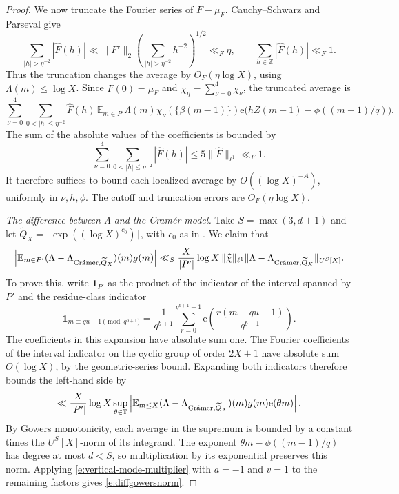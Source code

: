 \documentclass[12pt]{amsart}
\newcommand{\1}{\mathbf 1}
\newcommand{\e}{\mathrm e}
\newcommand{\Cramer}{\textup{Cr\'amer}}
\theoremstyle{definition}
\begin{document}
\begin{proof}
We now truncate the Fourier series of \(F-\mu_F\).
Cauchy--Schwarz and Parseval give
\[
 \sum_{|h|>\eta^{-2}}|\widehat F(h)|
 \ll \|F'\|_2
       \left(\sum_{|h|>\eta^{-2}}h^{-2}\right)^{1/2}
 \ll_F\eta,
 \qquad
 \sum_{h\in\mathbb Z}|\widehat F(h)|\ll_F1.
\]
Thus the truncation changes the average by \(O_F(\eta\log X)\),
using \(\Lambda(m)\leq\log X\). Since \(\widehat F(0)=\mu_F\) and
\(\chi_\eta=\sum_{\nu=0}^4\chi_\nu\), the truncated average is
\[
 \sum_{\nu=0}^4\sum_{0<|h|\leq\eta^{-2}}\widehat F(h)\,
 \mathbb E_{m\in P'}\Lambda(m)\chi_\nu(\{\beta(m-1)\})
 \e\bigl(hZ(m-1)-\phi((m-1)/q)\bigr).
\]
The sum of the absolute values of the coefficients is bounded by
\[
 \sum_{\nu=0}^4\sum_{0<|h|\leq\eta^{-2}}|\widehat F(h)|
 \leq 5\|\widehat F\|_{\ell^1}\ll_F 1.
\]
It therefore suffices to bound each localized average by
\(O((\log X)^{-A})\), uniformly in \(\nu,h,\phi\). The cutoff
and truncation errors are \(O_F(\eta\log X)\).

\medskip
\noindent\emph{The difference between \(\Lambda\) and the Cram\'er model.}
Take \(S=\max(3,d+1)\) and let
\(\widetilde Q_X=\lceil\exp((\log X)^{c_0})\rceil\), with \(c_0\)
as in \cite[Definition~2.3]{KMTT}. We claim that
\begin{align}\label{e:diffgowersnorm}
     \left|\mathbb E_{m\in P'}
   (\Lambda-\Lambda_{\Cramer,\widetilde Q_X})(m)g(m)\right|
 \ll_S
 \frac{X}{|P'|}\log X\,\|\widehat\chi\|_{\ell^1}
 \|\Lambda-\Lambda_{\Cramer,\widetilde Q_X}\|_{U^S[X]}.
\end{align}
To prove this, write \(\mathbf1_{P'}\) as the product of the
indicator of the interval spanned by \(P'\) and the residue-class
indicator
\[
 \mathbf1_{m\equiv qu+1\!\!\!\pmod{q^{b+1}}}
 =\frac1{q^{b+1}}\sum_{r=0}^{q^{b+1}-1}
   \e\!\left(\frac{r(m-qu-1)}{q^{b+1}}\right).
\]
The coefficients in this expansion have absolute sum one. The
Fourier coefficients of the interval indicator on the cyclic
group of order \(2X+1\) have absolute sum \(O(\log X)\), by the
geometric-series bound. Expanding both indicators therefore bounds
the left-hand side by
\[
 \ll \frac{X}{|P'|}\log X
 \sup_{\theta\in\mathbb T}
 \left|\mathbb E_{m\leq X}
   (\Lambda-\Lambda_{\Cramer,\widetilde Q_X})(m)
   g(m)\e(\theta m)\right|.
\]
By Gowers monotonicity, each average in the supremum is bounded
by a constant times the \(U^S[X]\)-norm of its integrand.
The exponent \(\theta m-\phi((m-1)/q)\) has degree at most \(d<S\),
so multiplication by its exponential preserves this norm.
Applying \eqref{e:vertical-mode-multiplier} with \(a=-1\) and
\(v=1\) to the remaining factors gives \eqref{e:diffgowersnorm}.


\end{proof}
\end{document}
